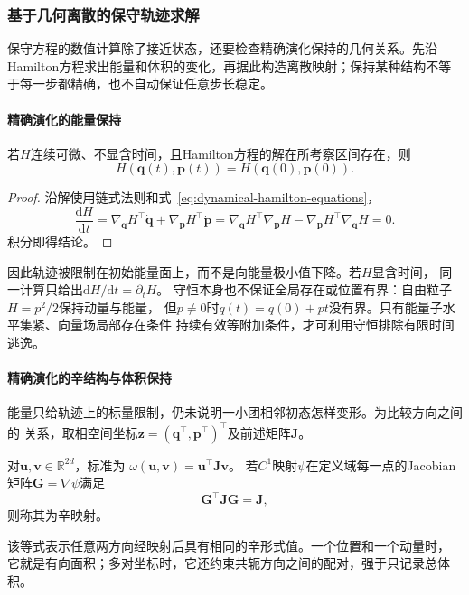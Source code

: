\subsubsection{基于几何离散的保守轨迹求解}
\label{sec:dynamical-hamiltonian-geometric-integration}
保守方程的数值计算除了接近状态，还要检查精确演化保持的几何关系。先沿Hamilton方程求出能量和体积的变化，再据此构造离散映射；保持某种结构不等于每一步都精确，也不自动保证任意步长稳定。

\paragraph{精确演化的能量保持}
\begin{theorem}[Hamilton能量守恒]
  \label{thm:dynamical-hamiltonian-energy-conservation}
  若$H$连续可微、不显含时间，且Hamilton方程的解在所考察区间存在，则
  \[
    H(\bm q(t),\bm p(t))=H(\bm q(0),\bm p(0)).
  \]
\end{theorem}
\begin{proof}
  沿解使用链式法则和式~\eqref{eq:dynamical-hamilton-equations}，
  \[
    \frac{\mathrm dH}{\mathrm dt}
    =\nabla_{\bm q}H^\top\dot{\bm q}
      +\nabla_{\bm p}H^\top\dot{\bm p}
    =\nabla_{\bm q}H^\top\nabla_{\bm p}H
      -\nabla_{\bm p}H^\top\nabla_{\bm q}H=0.
  \]
  积分即得结论。
\end{proof}
因此轨迹被限制在初始能量面上，而不是向能量极小值下降。若$H$显含时间，
同一计算只给出$\mathrm dH/\mathrm dt=\partial_tH$。
守恒本身也不保证全局存在或位置有界：自由粒子$H=p^2/2$保持动量与能量，
但$p\neq0$时$q(t)=q(0)+pt$没有界。只有能量子水平集紧、向量场局部存在条件
持续有效等附加条件，才可利用守恒排除有限时间逃逸。

\paragraph{精确演化的辛结构与体积保持}
能量只给轨迹上的标量限制，仍未说明一小团相邻初态怎样变形。为比较方向之间的
关系，取相空间坐标$\bm z=(\bm q^\top,\bm p^\top)^\top$及前述矩阵$\bm J$。
\begin{definition}[标准辛形式与辛映射]
  \label{def:dynamical-symplectic-form-map}
  对$\bm u,\bm v\in\mathbb R^{2d}$，标准为
  $\omega(\bm u,\bm v)=\bm u^\top\bm J\bm v$。
  若$C^1$映射$\psi$在定义域每一点的Jacobian矩阵$\bm G=\nabla\psi$满足
  \begin{equation}
    \bm G^\top\bm J\bm G=\bm J,
    \label{eq:dynamical-symplectic-map}
  \end{equation}
  则称其为辛映射。
\end{definition}
该等式表示任意两方向经映射后具有相同的辛形式值。一个位置和一个动量时，
它就是有向面积；多对坐标时，它还约束共轭方向之间的配对，强于只记录总体积。

